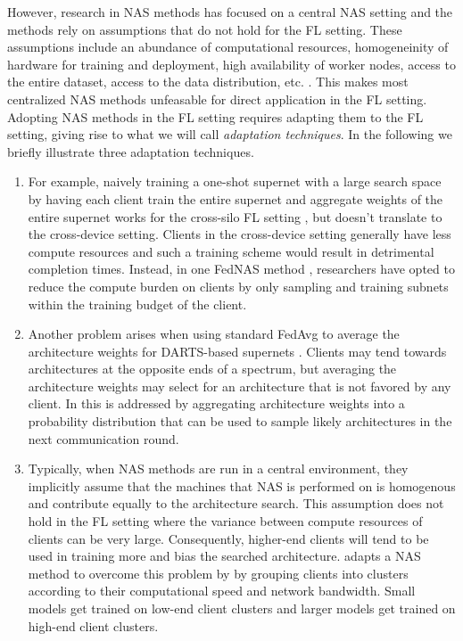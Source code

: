 However, research in NAS methods has focused on a central NAS setting and the methods rely on assumptions that do not hold for the FL setting. These assumptions include an abundance of computational resources, homogeneinity of hardware for training and deployment, high availability of worker nodes, access to the entire dataset, access to the data distribution, etc. \cite{fl_advances_and_open_problems_2021}. This makes most centralized NAS methods unfeasable for direct application in the FL setting. Adopting NAS methods in the FL setting requires adapting them to the FL setting, giving rise to what we will call \textit{adaptation techniques}. In the following we briefly illustrate three adaptation techniques. 


\begin{enumerate}
    \item For example, naively training a one-shot supernet with a large search space by having each client train the entire supernet and aggregate weights of the entire supernet works for the cross-silo FL setting \cite{fednas_2021}, but doesn't translate to the cross-device setting. Clients in the cross-device setting generally have less compute resources and such a training scheme would result in detrimental completion times. Instead, in one FedNAS method \cite{fedoras_2022}, researchers have opted to reduce the compute burden on clients by only sampling and training subnets within the training budget of the client.
    \item Another problem arises when using standard FedAvg to average the architecture weights for DARTS-based supernets \cite{darts_2019}. Clients may tend towards architectures at the opposite ends of a spectrum, but averaging the architecture weights may select for an architecture that is not favored by any client. In \cite{efnas_2024} this is addressed by aggregating architecture weights into a probability distribution that can be used to sample likely architectures in the next communication round.
    \item Typically, when NAS methods are run in a central environment, they implicitly assume that the machines that NAS is performed on is homogenous and contribute equally to the architecture search. This assumption does not hold in the FL setting where the variance between compute resources of clients can be very large. Consequently, higher-end clients will tend to be used in training more and bias the searched architecture. \cite{network_aware_fed_nas_2025} adapts a NAS method to overcome this problem by by grouping clients into clusters according to their computational speed and network bandwidth. Small models get trained on low-end client clusters and larger models get trained on high-end client clusters.
\end{enumerate}


